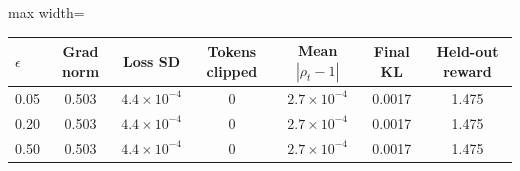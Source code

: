 \begin{adjustbox}{max width=\linewidth}
\begin{tabular}{lcccccc}
\toprule
$\epsilon$ & Grad norm & Loss SD & Tokens clipped & Mean $|\rho_t - 1|$ & Final KL & Held-out reward \\
\midrule
0.05 & 0.503 & $4.4 \times 10^{-4}$ & 0 & $2.7 \times 10^{-4}$ & 0.0017 & 1.475 \\
0.20 & 0.503 & $4.4 \times 10^{-4}$ & 0 & $2.7 \times 10^{-4}$ & 0.0017 & 1.475 \\
0.50 & 0.503 & $4.4 \times 10^{-4}$ & 0 & $2.7 \times 10^{-4}$ & 0.0017 & 1.475 \\
\bottomrule
\end{tabular}
\end{adjustbox}
